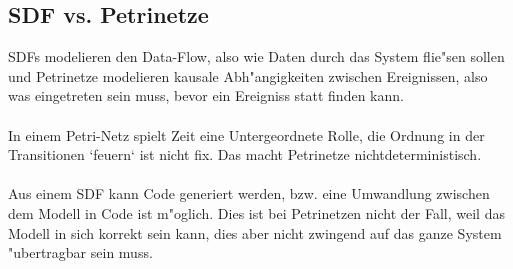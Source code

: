 \documentclass{article}
\begin{document}
\subsection{SDF vs. Petrinetze}
SDFs modelieren den Data-Flow, also wie Daten durch das System flie"sen sollen
    und Petrinetze modelieren kausale Abh"angigkeiten zwischen Ereignissen,
    also was eingetreten sein muss, bevor ein Ereigniss statt finden kann.\\
\\
In einem Petri-Netz spielt Zeit eine Untergeordnete Rolle, die Ordnung in der
    Transitionen `feuern` ist nicht fix. Das macht Petrinetze 
    nichtdeterministisch.\\
\\
Aus einem SDF kann Code generiert werden, bzw. eine Umwandlung zwischen dem
    Modell in Code ist m"oglich. Dies ist bei Petrinetzen nicht der Fall, weil
    das Modell in sich korrekt sein kann, dies aber nicht zwingend auf das 
    ganze System "ubertragbar sein muss.\\
\end{document}
